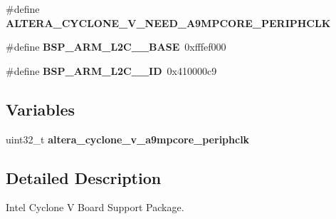 \begin{DoxyCompactItemize}
\item 
\mbox{\label{group__RTEMSBSPsARMCycV_ga72452d1e115c06670ae836346ac3c978}} 
\#define {\bfseries A\+L\+T\+E\+R\+A\+\_\+\+C\+Y\+C\+L\+O\+N\+E\+\_\+\+V\+\_\+\+N\+E\+E\+D\+\_\+\+A9\+M\+P\+C\+O\+R\+E\+\_\+\+P\+E\+R\+I\+P\+H\+C\+LK}
\item 
\mbox{\label{group__RTEMSBSPsARMCycV_ga391fae2c7d3fd5e1a00a7e35c957f7e5}} 
\#define {\bfseries B\+S\+P\+\_\+\+A\+R\+M\+\_\+\+L2\+C\+\_\+\_\+\+B\+A\+SE}~0xfffef000
\item 
\mbox{\label{group__RTEMSBSPsARMCycV_gae8b45f48489ee7827e4e919e5e65bb25}} 
\#define {\bfseries B\+S\+P\+\_\+\+A\+R\+M\+\_\+\+L2\+C\+\_\+\_\+\+ID}~0x410000c9
\end{DoxyCompactItemize}
\subsection*{Variables}
\begin{DoxyCompactItemize}
\item 
\mbox{\label{group__RTEMSBSPsARMCycV_ga306c58fa48d82ad0feb3546e271fc98a}} 
uint32\+\_\+t {\bfseries altera\+\_\+cyclone\+\_\+v\+\_\+a9mpcore\+\_\+periphclk}
\end{DoxyCompactItemize}


\subsection{Detailed Description}
Intel Cyclone V Board Support Package. 

